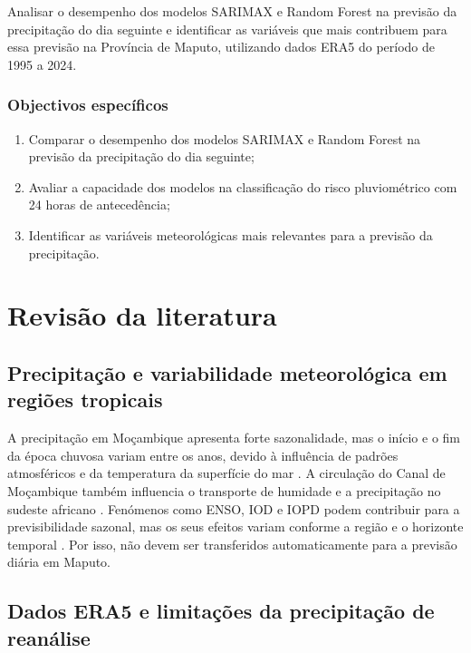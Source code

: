 \documentclass[9pt,twocolumn,twoside,english,portuguese]{opticajnl}
\begin{document}
Analisar o desempenho dos modelos SARIMAX e Random Forest na previsão da precipitação do dia seguinte e identificar as variáveis que mais contribuem
para essa previsão na Província de Maputo, utilizando dados ERA5 do período
de 1995 a 2024.

\subsubsection{Objectivos específicos}

\begin{enumerate}
    \item Comparar o desempenho dos modelos SARIMAX e Random Forest na
    previsão da precipitação do dia seguinte;

    \item Avaliar a capacidade dos modelos na classificação do risco
    pluviométrico com 24 horas de antecedência;

    \item Identificar as variáveis meteorológicas mais relevantes para a
    previsão da precipitação.
\end{enumerate}

\section{Revisão da literatura}

\subsection{Precipitação e variabilidade meteorológica em regiões tropicais}

A precipitação em Moçambique apresenta forte sazonalidade, mas o início e o
fim da época chuvosa variam entre os anos, devido à influência de padrões
atmosféricos e da temperatura da superfície do mar
\cite{Manhique2023OnsetMozambique}. A circulação do Canal de Moçambique
também influencia o transporte de humidade e a precipitação no sudeste
africano \cite{Barimalala2020MozambiqueChannelTrough}. Fenómenos como ENSO,
IOD e IOPD podem contribuir para a previsibilidade sazonal, mas os seus
efeitos variam conforme a região e o horizonte temporal
\cite{Horan2024SeasonalSouthernAfrica}. Por isso, não devem ser transferidos
automaticamente para a previsão diária em Maputo.

\subsection{Dados ERA5 e limitações da precipitação de reanálise}
\end{document}
